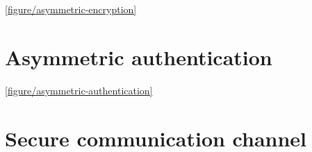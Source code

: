 
\autoref{figure/asymmetric-encryption}




\section{Asymmetric authentication}


\autoref{figure/asymmetric-authentication}




\section{Secure communication channel}


